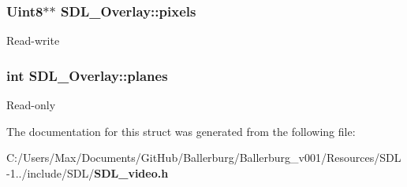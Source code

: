 \subsubsection[{pixels}]{\setlength{\rightskip}{0pt plus 5cm}Uint8$\ast$$\ast$ S\+D\+L\+\_\+\+Overlay\+::pixels}\label{struct_s_d_l___overlay_a782b8904e618e8a1c2c8299c3994ec8f}
Read-\/write 
\subsubsection[{planes}]{\setlength{\rightskip}{0pt plus 5cm}int S\+D\+L\+\_\+\+Overlay\+::planes}\label{struct_s_d_l___overlay_ab91d676ef6310197aa189c469be3d50a}
Read-\/only 

The documentation for this struct was generated from the following file\+:\begin{DoxyCompactItemize}
\item 
C\+:/\+Users/\+Max/\+Documents/\+Git\+Hub/\+Ballerburg/\+Ballerburg\+\_\+v001/\+Resources/\+S\+D\+L-\/1../include/\+S\+D\+L/{\bf S\+D\+L\+\_\+video.\+h}\end{DoxyCompactItemize}
